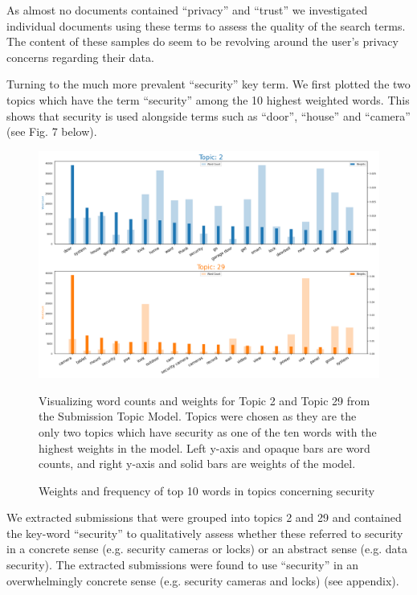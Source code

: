 \documentclass{article}
\begin{document}
    As almost no documents contained “privacy” and “trust” we investigated individual documents using these terms to assess the quality of the search terms. The content of these samples do seem to be revolving around the user’s privacy concerns regarding their data.
    
    Turning to the much more prevalent “security” key term. We first plotted the two topics which have the term “security” among the 10 highest weighted words. This shows that security is used alongside terms such as “door”, “house” and “camera” (see Fig. 7 below).
    
    \begin{figure}[H]
        \begin{centering}
        \includegraphics[scale=0.3]{../Figure/H2_topic_weight_prelim.png}
        \caption{Weights and frequency of top 10 words in topics concerning security}
        \end{centering}
        \begin{footnotesize} 
            Visualizing word counts and weights for Topic 2 and Topic 29 from the Submission Topic Model. Topics were chosen as they are the only two topics which have security as one of the ten words with the highest weights in the model. Left y-axis and opaque bars are word counts, and right y-axis and solid bars are weights of the model. 
        \end{footnotesize}
    \end{figure}

    We extracted submissions that were grouped into topics 2 and 29 and contained the key-word “security” to qualitatively assess whether these referred to security in a concrete sense (e.g. security cameras or locks) or an abstract sense (e.g. data security). The extracted submissions were found to use “security” in an overwhelmingly concrete sense (e.g. security cameras and locks) (see appendix). 
\end{document}
